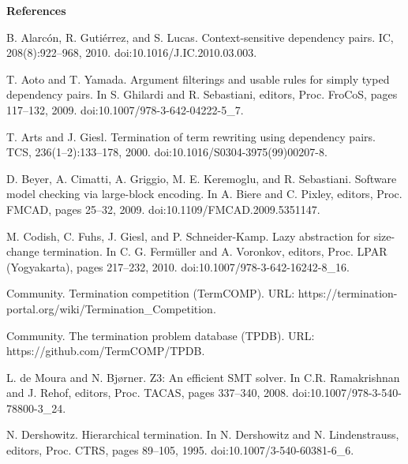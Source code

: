
 
\par\medskip\noindent\textbf{References}\par
  
\par\noindent  [1]  B. Alarcón, R. Gutiérrez, and S. Lucas.  Context-sensitive dependency pairs.  IC, 208(8):922–968, 2010.  doi:10.1016/J.IC.2010.03.003.  
 
\par\noindent  [2]  T. Aoto and T. Yamada.  Argument filterings and usable rules for simply typed dependency pairs.  In S. Ghilardi and R. Sebastiani, editors, Proc. FroCoS, pages 117–132, 2009.  doi:10.1007/978-3-642-04222-5\_7.  
 
\par\noindent  [3]  T. Arts and J. Giesl.  Termination of term rewriting using dependency pairs.  TCS, 236(1–2):133–178, 2000.  doi:10.1016/S0304-3975(99)00207-8.  
 
\par\noindent  [4]  D. Beyer, A. Cimatti, A. Griggio, M. E. Keremoglu, and R. Sebastiani.  Software model checking via large-block encoding.  In A. Biere and C. Pixley, editors, Proc. FMCAD, pages 25–32, 2009.  doi:10.1109/FMCAD.2009.5351147.  
 
\par\noindent  [5]  M. Codish, C. Fuhs, J. Giesl, and P. Schneider-Kamp.  Lazy abstraction for size-change termination.  In C. G. Fermüller and A. Voronkov, editors, Proc. LPAR (Yogyakarta), pages 217–232, 2010.  doi:10.1007/978-3-642-16242-8\_16.  
 
\par\noindent  [6]  Community.  Termination competition (TermCOMP).  URL: https://termination-portal.org/wiki/Termination\_Competition.  
 
\par\noindent  [7]  Community.  The termination problem database (TPDB).  URL: https://github.com/TermCOMP/TPDB.  
 
\par\noindent  [8]  L. de Moura and N. Bjørner.  Z3: An efficient SMT solver.  In C.R. Ramakrishnan and J. Rehof, editors, Proc. TACAS, pages 337–340, 2008.  doi:10.1007/978-3-540-78800-3\_24.  
 
\par\noindent  [9]  N. Dershowitz.  Hierarchical termination.  In N. Dershowitz and N. Lindenstrauss, editors, Proc. CTRS, pages 89–105, 1995.  doi:10.1007/3-540-60381-6\_6.  
 
